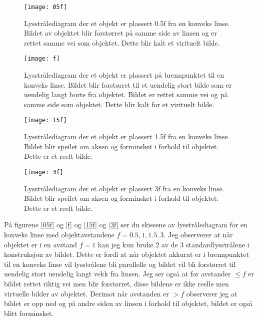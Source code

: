 \documentclass[a4paper,12pt,norsk]{article}
\begin{document}
\begin{figure}
	\begin{minipage}{\linewidth}
	\centering
	\texttt{[image: 05f]}
	\caption[Objektavstand 0.5f]{Lysstrålediagram der et objekt er plassert 0.5f fra en konveks linse. Bildet av objektet blir forstørret på samme side av linsen og er rettet samme vei som objektet. Dette blir kalt et virituelt bilde.}
	\label{05f}
	\end{minipage}
	\hspace{.5cm}
	\begin{minipage}{\linewidth}
	\centering
	\texttt{[image: f]}
	\caption[Objektavstand f]{Lysstrålediagram der et objekt er plassert på brennpunktet til en konveks linse. Bildet blir forstørret til et uendelig stort bilde som er uendelig langt borte fra objektet. Bildet er rettet samme vei og på samme side som objektet. Dette blir kalt for et virituelt bilde.}
	\label{f}
	\end{minipage}
\end{figure}
\begin{figure}
	\begin{minipage}{\linewidth}
	\centering
	\texttt{[image: 15f]}
	\caption[Objektavstand 1.5f]{Lysstrålediagram der et objekt er plassert 1.5f fra en konveks linse. Bildet blir speilet om aksen og forminsket i forhold til objektet. Dette er et reelt bilde.}
	\label{15f}
	\end{minipage}
	\hspace{.5cm}
	\begin{minipage}{\linewidth}
	\centering
	\texttt{[image: 3f]}
	\caption[Objektavstand 3f]{Lysstrålediagram der et objekt er plassert 3f fra en konveks linse. Bildet blir speilet om aksen og forminsket i forhold til objektet. Dette er et reelt bilde.}
	\label{3f}
	\end{minipage}
\end{figure}

På figurene \ref{05f} og \vref{f} og \ref{15f} og \vref{3f} ser du skissene av lysstrålediagram for en konveks linse med objektavstandene $f = 0.5, 1, 1.5, 3$. Jeg observerer at når objektet er i en avstand $f=1$ kan jeg kun bruke 2 av de 3 standardlysstrålene i konstruksjon av bildet. Dette er fordi at når objektet akkurat er i brennpunktet til en konveks linse vil lysstrålene bli parallelle og bildet vil bli forstørret til uendelig stort uendelig langt vekk fra linsen. Jeg ser også at for avstander $ \leq f $ er bildet rettet riktig vei men blir forstørret, disse bildene er ikke reelle men virtuelle bilder av objektet. Derimot når avstanden er $>f$ observerer jeg at bildet er opp ned og på andre siden av linsen i forhold til objektet, bildet er også blitt forminsket. 
\end{document}
